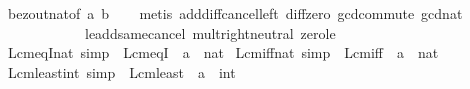 \begin{isabellebody}
%
\isatagproof
{}\isamarkupfalse%
\ bezout{\isacharunderscore}{\kern0pt}nat{\isacharbrackleft}{\kern0pt}of\ a\ b{\isacharbrackright}{\kern0pt}\isanewline
\ \ \isamarkupfalse%
\ {\isacharparenleft}{\kern0pt}metis\ add{\isacharunderscore}{\kern0pt}diff{\isacharunderscore}{\kern0pt}cancel{\isacharunderscore}{\kern0pt}left{\isacharprime}{\kern0pt}\ diff{\isacharunderscore}{\kern0pt}zero\ gcd{\isachardot}{\kern0pt}commute\ gcd{\isacharunderscore}{\kern0pt}{}{\isacharunderscore}{\kern0pt}nat\isanewline
\ \ \ \ \ \ \ \ \ \ \ \ le{\isacharunderscore}{\kern0pt}add{\isacharunderscore}{\kern0pt}same{\isacharunderscore}{\kern0pt}cancel{}\ mult{\isachardot}{\kern0pt}right{\isacharunderscore}{\kern0pt}neutral\ zero{\isacharunderscore}{\kern0pt}le{\isacharparenright}{\kern0pt}%
\endisatagproof
{\isafoldproof}%
%
\isadelimproof
\isanewline
%
\endisadelimproof
\isanewline
{}\isamarkupfalse%
\ Lcm{\isacharunderscore}{\kern0pt}eq{\isacharunderscore}{\kern0pt}{}{\isacharunderscore}{\kern0pt}I{\isacharunderscore}{\kern0pt}nat\ {\isacharbrackleft}{\kern0pt}simp{\isacharbrackright}{\kern0pt}\ {\isacharequal}{\kern0pt}\ Lcm{\isacharunderscore}{\kern0pt}eq{\isacharunderscore}{\kern0pt}{}{\isacharunderscore}{\kern0pt}I\ {\isacharbrackleft}{\kern0pt}\ {\isacharquery}{\kern0pt}{\isacharprime}{\kern0pt}a\ {\isacharequal}{\kern0pt}\ nat{\isacharbrackright}{\kern0pt}\isanewline
{}\isamarkupfalse%
\ Lcm{\isacharunderscore}{\kern0pt}{}{\isacharunderscore}{\kern0pt}iff{\isacharunderscore}{\kern0pt}nat\ {\isacharbrackleft}{\kern0pt}simp{\isacharbrackright}{\kern0pt}\ {\isacharequal}{\kern0pt}\ Lcm{\isacharunderscore}{\kern0pt}{}{\isacharunderscore}{\kern0pt}iff\ {\isacharbrackleft}{\kern0pt}\ {\isacharquery}{\kern0pt}{\isacharprime}{\kern0pt}a\ {\isacharequal}{\kern0pt}\ nat{\isacharbrackright}{\kern0pt}\isanewline
{}\isamarkupfalse%
\ Lcm{\isacharunderscore}{\kern0pt}least{\isacharunderscore}{\kern0pt}int\ {\isacharbrackleft}{\kern0pt}simp{\isacharbrackright}{\kern0pt}\ {\isacharequal}{\kern0pt}\ Lcm{\isacharunderscore}{\kern0pt}least\ {\isacharbrackleft}{\kern0pt}\ {\isacharquery}{\kern0pt}{\isacharprime}{\kern0pt}a\ {\isacharequal}{\kern0pt}\ int{\isacharbrackright}{\kern0pt}%
\isadelimdocument
%
\endisadelimdocument
%
\isatagdocument
%
\isamarkuptrue%
%
\endisatagdocument
{\isafolddocument}%
%
\isadelimdocument
%
\endisadelimdocument

\end{isabellebody}

